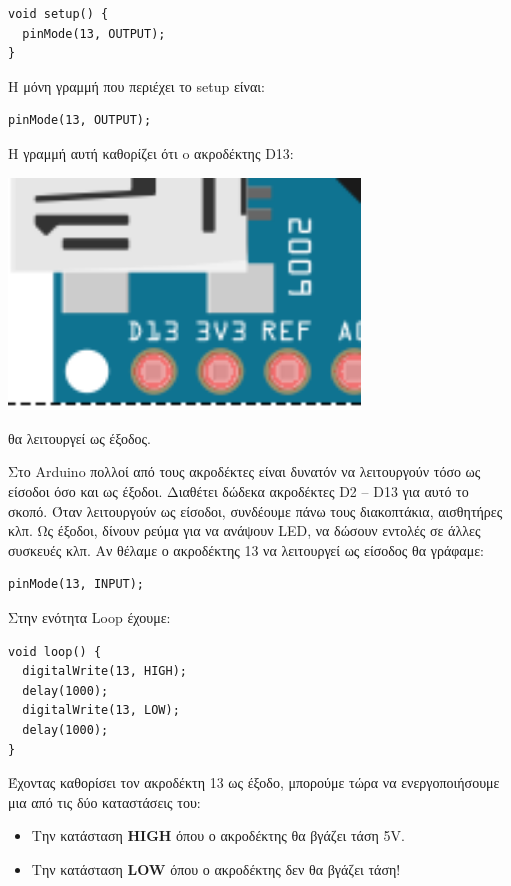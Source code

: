 \documentclass[a4paper,twoside,12pt]{article}
\begin{document}
\begin{verbatim}
void setup() {
  pinMode(13, OUTPUT);
}
\end{verbatim}

H μόνη γραμμή που περιέχει το setup είναι:

\begin{verbatim}
pinMode(13, OUTPUT);
\end{verbatim}

Η γραμμή αυτή καθορίζει ότι o ακροδέκτης D13:

\begin{center}
  \includegraphics[width=0.7\textwidth]{images/main/d13}
\end{center}

θα λειτουργεί ως έξοδος. 

Στο Arduino πολλοί από τους ακροδέκτες είναι δυνατόν να λειτουργούν τόσο ως είσοδοι όσο και ως έξοδοι. Διαθέτει δώδεκα ακροδέκτες D2 -- D13 για αυτό το σκοπό.  Όταν λειτουργούν ως είσοδοι, συνδέουμε πάνω τους διακοπτάκια, αισθητήρες κλπ. Ως έξοδοι, δίνουν ρεύμα για να ανάψουν LED, να δώσουν εντολές σε άλλες συσκευές κλπ. Αν θέλαμε ο ακροδέκτης 13 να λειτουργεί ως είσοδος θα γράφαμε:

\begin{verbatim}
pinMode(13, INPUT);
\end{verbatim}

Στην ενότητα Loop έχουμε:

\begin{verbatim}
void loop() {
  digitalWrite(13, HIGH);   
  delay(1000);              
  digitalWrite(13, LOW);    
  delay(1000);
}
\end{verbatim}

Έχοντας καθορίσει τον ακροδέκτη 13 ως έξοδο, μπορούμε τώρα να ενεργοποιήσουμε μια από τις δύο καταστάσεις του:

\begin{itemize}
\item Την κατάσταση \textbf{HIGH} όπου ο ακροδέκτης θα βγάζει τάση 5V.
\item Την κατάσταση \textbf{LOW} όπου ο ακροδέκτης δεν θα βγάζει τάση!
\end{itemize}
\end{document}
